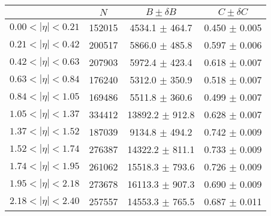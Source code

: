 \begin{tabular}{lccc}
\hline
    &   $N$   & $B \pm \delta B$  &  $C \pm \delta C$ \\
\hline
$0.00 < |\eta| <0.21$          & 152015     & 4534.1     $\pm$ 464.7 & 0.450      $\pm$ 0.005 \\
$0.21 < |\eta| <0.42$          & 200517     & 5866.0     $\pm$ 485.8 & 0.597      $\pm$ 0.006 \\
$0.42 < |\eta| <0.63$          & 207903     & 5972.4     $\pm$ 423.4 & 0.618      $\pm$ 0.007 \\
$0.63 < |\eta| <0.84$          & 176240     & 5312.0     $\pm$ 350.9 & 0.518      $\pm$ 0.007 \\
$0.84 < |\eta| <1.05$          & 169486     & 5511.8     $\pm$ 360.6 & 0.499      $\pm$ 0.007 \\
$1.05 < |\eta| <1.37$          & 334412     & 13892.2    $\pm$ 912.8 & 0.628      $\pm$ 0.007 \\
$1.37 < |\eta| <1.52$          & 187039     & 9134.8     $\pm$ 494.2 & 0.742      $\pm$ 0.009 \\
$1.52 < |\eta| <1.74$          & 276387     & 14322.2    $\pm$ 811.1 & 0.733      $\pm$ 0.009 \\
$1.74 < |\eta| <1.95$          & 261062     & 15518.3    $\pm$ 793.6 & 0.726      $\pm$ 0.009 \\
$1.95 < |\eta| <2.18$          & 273678     & 16113.3    $\pm$ 907.3 & 0.690      $\pm$ 0.009 \\
$2.18 < |\eta| <2.40$          & 257557     & 14553.3    $\pm$ 765.5 & 0.687      $\pm$ 0.011 \\
\hline
\end{tabular}
